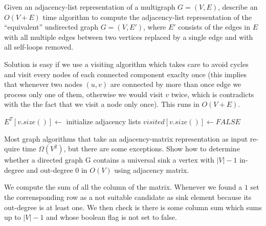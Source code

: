 \begin{problem}
Given an adjacency-list representation of a multigraph  $G = (V,E)$, describe an
$O(V + E)$ time algorithm to compute the adjacency-list representation of the
“equivalent” undirected graph  $G = (V,E')$, where $E'$ consists of the edges in $E$
with all multiple edges between two vertices replaced by a single edge and with all
self-loops removed.

\begin{solution}
Solution is easy if we use a visiting algorithm which takes care to avoid cycles and visit every nodes of each connected component exaclty once (this implies that whenever two nodes $(u,v)$ are connected by more than once edge we process only one of them, otherwise we would visit $v$ twice, which is contradicts with the the fact that we visit a node only once). This runs in $O(V+E)$.

	\begin{algorithm}
 $E^T[v.size()] \gets $ initialize adjacency lists\;
 $visited[v.size()] \gets FALSE$\;

\;
\end{algorithm}


\end{solution}
\end{problem}

\begin{problem}
Most graph algorithms that take an adjacency-matrix representation as input re-
quire time $\Omega(V^2)$, but there are some exceptions. Show how to determine whether
a directed graph G contains a universal sink a vertex with $|V|-1$ in-degree and out-degree $0$ in $O(V)$ using adjacency matrix.
\begin{solution}
We compute the sum of all the column of the matrix. Whenever we found a $1$ set the corrensponding row as a not suitable candidate as sink element because its out-degree is at least one.
We then check is there is some column sum which sums up to $|V|-1$ and whose boolean flag is not set to false.

\end{solution}
\end{problem}



